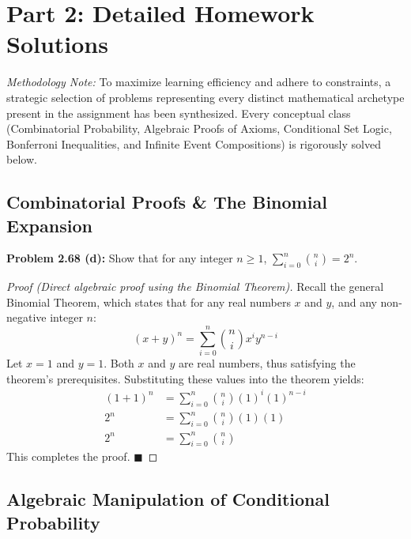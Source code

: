 \documentclass[12pt]{article}
\theoremstyle{definition}
\theoremstyle{remark}
\begin{document}
\newpage
\section{Part 2: Detailed Homework Solutions}
\textit{Methodology Note:} To maximize learning efficiency and adhere to constraints, a strategic selection of problems representing every distinct mathematical archetype present in the assignment has been synthesized. Every conceptual class (Combinatorial Probability, Algebraic Proofs of Axioms, Conditional Set Logic, Bonferroni Inequalities, and Infinite Event Compositions) is rigorously solved below.

\subsection{Combinatorial Proofs \& The Binomial Expansion}

\textbf{Problem 2.68 (d):} Show that for any integer $n \ge 1$, $\sum_{i=0}^n \binom{n}{i} = 2^n$.
\begin{proof}[Proof (Direct algebraic proof using the Binomial Theorem)]
Recall the general Binomial Theorem, which states that for any real numbers $x$ and $y$, and any non-negative integer $n$:
\[ (x + y)^n = \sum_{i=0}^n \binom{n}{i} x^i y^{n-i} \]
Let $x = 1$ and $y = 1$. Both $x$ and $y$ are real numbers, thus satisfying the theorem's prerequisites. Substituting these values into the theorem yields:
\begin{align*}
(1 + 1)^n &= \sum_{i=0}^n \binom{n}{i} (1)^i (1)^{n-i} \\
2^n &= \sum_{i=0}^n \binom{n}{i} (1) (1) \\
2^n &= \sum_{i=0}^n \binom{n}{i}
\end{align*}
This completes the proof. $\blacksquare$
\end{proof}

\subsection{Algebraic Manipulation of Conditional Probability}
\end{document}
